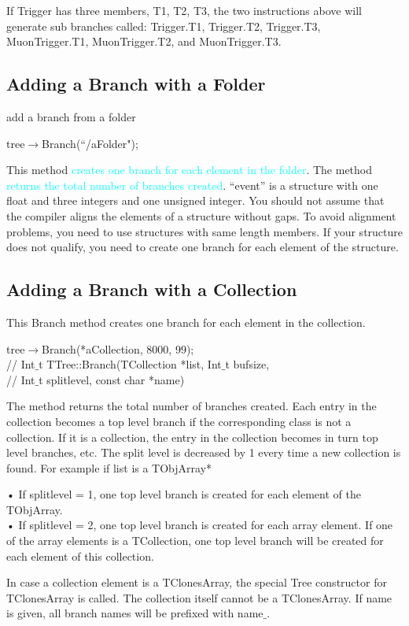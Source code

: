\documentclass[12pt,a4paper]{article}
\begin{document}
If Trigger has three members, T1, T2, T3, the two instructions above will generate sub branches called: Trigger.T1,
Trigger.T2, Trigger.T3, MuonTrigger.T1, MuonTrigger.T2, and MuonTrigger.T3.

\subsection{Adding a Branch with a Folder}
add a branch from a folder

tree$\rightarrow$Branch(``/aFolder");

This method \textcolor{cyan}{creates one branch for each element in the folder}. The method \textcolor{cyan}{returns the total number of branches created}. ``event” is a structure with one float and three integers and one unsigned integer. You should not assume that the compiler aligns the elements of a structure without gaps. To avoid alignment problems, you need to use structures with same length members. If your structure does not qualify, you need to create one branch for each element of the structure. 


\subsection{Adding a Branch with a Collection}
This Branch method creates one branch for each element in the collection.

tree$\rightarrow$Branch(*aCollection, 8000, 99); \\
// Int$\_$t TTree::Branch(TCollection *list, Int$\_$t bufsize, \\
// Int$\_$t splitlevel, const char *name)

The method returns the total number of branches created. Each entry in the collection becomes a top level branch if the corresponding class is not a collection. If it is a collection, the entry in the collection becomes in turn top level branches, etc. The split level is decreased by 1 every time a new collection is found. For example if list is a TObjArray*

• If splitlevel = 1, one top level branch is created for each element of the TObjArray.\\
• If splitlevel = 2, one top level branch is created for each array element. If one of the array elements is a TCollection, one top level branch will be created for each element of this collection.

In case a collection element is a TClonesArray, the special Tree constructor for TClonesArray is called. The collection itself cannot be a TClonesArray. If name is given, all branch names will be prefixed with name$\_$.
\end{document}
